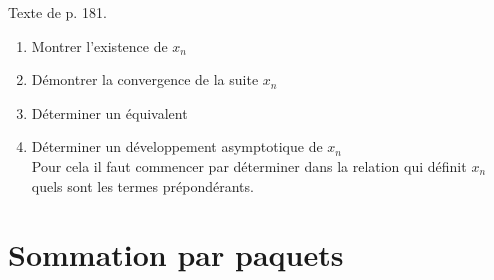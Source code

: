 \begin{methode}
    Texte de \cite{oraux_x_ens_3} p. 181.
    \begin{enumerate}
        \item Montrer l'existence de $x_n$
        \item Démontrer la convergence de la suite $x_n$
        \item Déterminer un équivalent 
        \item Déterminer un développement asymptotique de $x_n$ \\
        Pour cela il faut commencer par déterminer dans la relation qui définit $x_n$ quels sont les termes prépondérants. 
    \end{enumerate}
\end{methode}

\section{Sommation par paquets}
